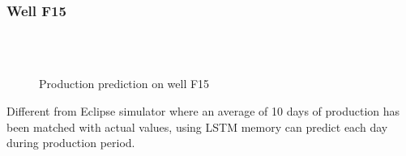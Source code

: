 \documentclass[12pt,a4paper]{report}
\begin{document}
\subsubsection{Well F15}
\begin{figure}[H]
     \begin{center}
%
		\\
        \\%

    \end{center}
    \caption{%
        Production prediction on well F15
     }%
   \label{fig:subfigures}
\end{figure}
Different from Eclipse simulator where an average of 10 days of production has been matched with actual values, using LSTM memory can predict each day during production period.\\
\end{document}

